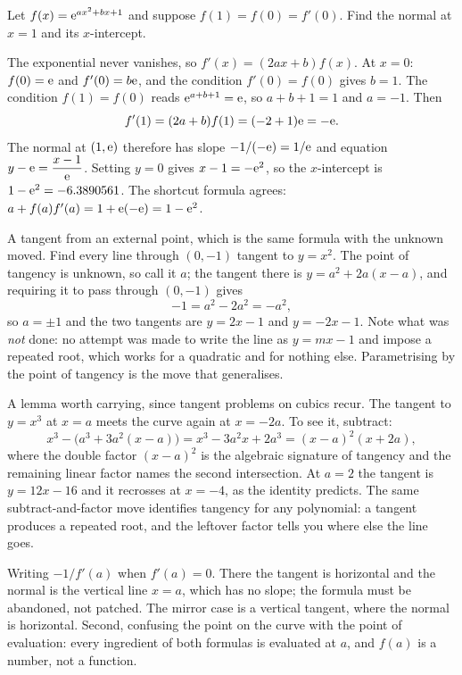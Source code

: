 \begin{worked}
Let $f(x)=\mathrm{e}^{ax^{2}+bx+1}$ and suppose $f(1)=f(0)=f'(0)$. Find the normal at $x=1$ and its $x$-intercept.

The exponential never vanishes, so $f'(x)=(2ax+b)f(x)$. At $x=0$: $f(0)=\mathrm{e}$ and $f'(0)=b\mathrm{e}$, and the condition $f'(0)=f(0)$ gives $b=1$. The condition $f(1)=f(0)$ reads $\mathrm{e}^{a+b+1}=\mathrm{e}$, so $a+b+1=1$ and $a=-1$. Then
\[
f'(1)=(2a+b)f(1)=(-2+1)\mathrm{e}=-\mathrm{e} .
\]
The normal at $(1,\mathrm{e})$ therefore has slope $-1/(-\mathrm{e})=1/\mathrm{e}$ and equation $y-\mathrm{e}=\dfrac{x-1}{\mathrm{e}}$. Setting $y=0$ gives $x-1=-\mathrm{e}^{2}$, so the $x$-intercept is $1-\mathrm{e}^{2}=-6.3890561$. The shortcut formula agrees: $a+f(a)f'(a)=1+\mathrm{e}(-\mathrm{e})=1-\mathrm{e}^{2}$.

A tangent from an external point, which is the same formula with the unknown moved. Find every line through $(0,-1)$ tangent to $y=x^{2}$. The point of tangency is unknown, so call it $a$; the tangent there is $y=a^{2}+2a(x-a)$, and requiring it to pass through $(0,-1)$ gives
\[
-1=a^{2}-2a^{2}=-a^{2},
\]
so $a=\pm1$ and the two tangents are $y=2x-1$ and $y=-2x-1$. Note what was \emph{not} done: no attempt was made to write the line as $y=mx-1$ and impose a repeated root, which works for a quadratic and for nothing else. Parametrising by the point of tangency is the move that generalises.

A lemma worth carrying, since tangent problems on cubics recur. The tangent to $y=x^{3}$ at $x=a$ meets the curve again at $x=-2a$. To see it, subtract:
\[
x^{3}-\bigl(a^{3}+3a^{2}(x-a)\bigr)=x^{3}-3a^{2}x+2a^{3}=(x-a)^{2}(x+2a),
\]
where the double factor $(x-a)^{2}$ is the algebraic signature of tangency and the remaining linear factor names the second intersection. At $a=2$ the tangent is $y=12x-16$ and it recrosses at $x=-4$, as the identity predicts. The same subtract-and-factor move identifies tangency for any polynomial: a tangent produces a repeated root, and the leftover factor tells you where else the line goes.
\end{worked}

\begin{trap}
Writing $-1/f'(a)$ when $f'(a)=0$. There the tangent is horizontal and the normal is the vertical line $x=a$, which has no slope; the formula must be abandoned, not patched. The mirror case is a vertical tangent, where the normal is horizontal. Second, confusing the point on the curve with the point of evaluation: every ingredient of both formulas is evaluated at $a$, and $f(a)$ is a number, not a function.
\end{trap}

